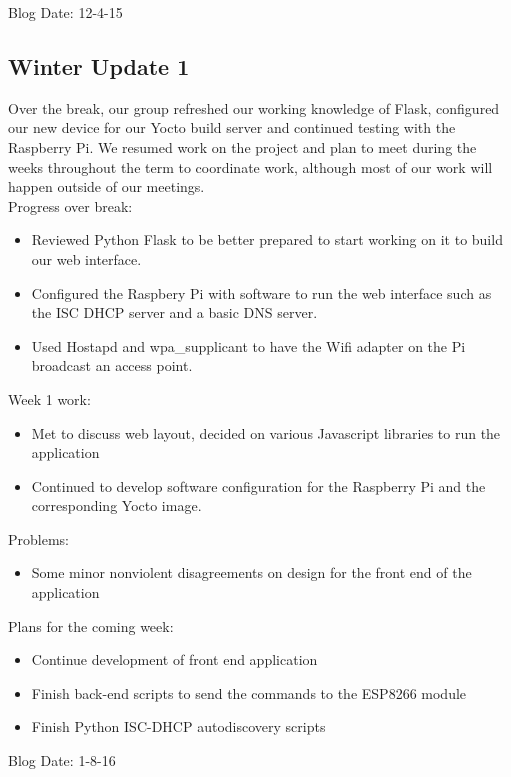 Blog Date: 12-4-15

\subsection{Winter Update 1}
Over the break, our group refreshed our working knowledge of Flask, configured our new device for our Yocto build server and continued testing with the Raspberry Pi. We resumed work on the project and plan to meet during the weeks throughout the term to coordinate work, although most of our work will happen outside of our meetings. \\
Progress over break:
\begin{itemize}
   \item Reviewed Python Flask to be better prepared to start working on it to build our web interface.
   \item Configured the Raspbery Pi with software to run the web interface such as the ISC DHCP server and a basic DNS server.
   \item Used Hostapd and wpa\_supplicant to have the Wifi adapter on the Pi broadcast an access point.
\end{itemize}
Week 1 work:
\begin{itemize}
   \item Met to discuss web layout, decided on various Javascript libraries to run the application
   \item Continued to develop software configuration for the Raspberry Pi and the corresponding Yocto image.
\end{itemize}
Problems:
\begin{itemize}
   \item Some minor nonviolent disagreements on design for the front end of the application​
\end{itemize}
Plans for the coming week:
\begin{itemize}
   \item Continue development of front end application
   \item Finish back-end scripts to send the commands to the ESP8266 module
   \item Finish Python ISC-DHCP autodiscovery scripts
\end{itemize}
Blog Date: 1-8-16

